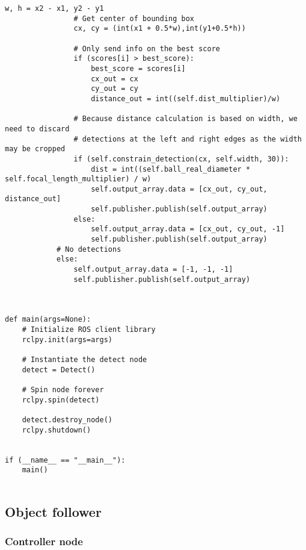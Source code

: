 \begin{lstlisting}[language=PythonPlus, basicstyle=\tiny,]
                w, h = x2 - x1, y2 - y1
                # Get center of bounding box
                cx, cy = (int(x1 + 0.5*w),int(y1+0.5*h))

                # Only send info on the best score
                if (scores[i] > best_score):
                    best_score = scores[i]
                    cx_out = cx
                    cy_out = cy
                    distance_out = int((self.dist_multiplier)/w)

                # Because distance calculation is based on width, we need to discard
                # detections at the left and right edges as the width may be cropped
                if (self.constrain_detection(cx, self.width, 30)):
                    dist = int((self.ball_real_diameter * self.focal_length_multiplier) / w)
                    self.output_array.data = [cx_out, cy_out, distance_out]
                    self.publisher.publish(self.output_array)
                else:
                    self.output_array.data = [cx_out, cy_out, -1]
                    self.publisher.publish(self.output_array)
            # No detections
            else:
                self.output_array.data = [-1, -1, -1]
                self.publisher.publish(self.output_array)



def main(args=None):
    # Initialize ROS client library
    rclpy.init(args=args)

    # Instantiate the detect node
    detect = Detect()

    # Spin node forever
    rclpy.spin(detect)

    detect.destroy_node()
    rclpy.shutdown()
    

if (__name__ == "__main__"):
    main()


\end{lstlisting}






\subsection{Object follower}

\subsubsection{Controller node}

